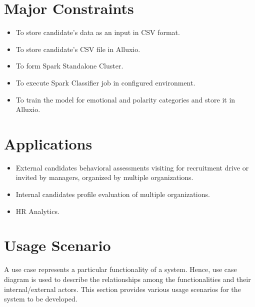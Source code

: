 \documentclass[oneside,a4paper,12pt]{pictreport}
\begin{document}
\section{Major Constraints}

\begin{itemize}
\item To store candidate's data as an input in CSV format.
\item To store candidate's CSV file in Alluxio.
\item To form Spark Standalone Cluster. 
\item To execute Spark Classifier job in configured environment.
\item To train the model for emotional and polarity categories and store it in Alluxio.
\end{itemize}

\section{Applications}
\begin{itemize}
\item External candidates behavioral assessments visiting for recruitment drive or invited by
managers, organized by multiple organizations.
\item Internal candidates profile evaluation of multiple organizations.
\item HR Analytics.
\end{itemize}

\section{Usage Scenario}
A use case represents a particular functionality of a system. Hence, use case diagram is used to describe the relationships among the functionalities and their internal/external actors. This section provides various usage scenarios for the system to be developed.
\end{document}
